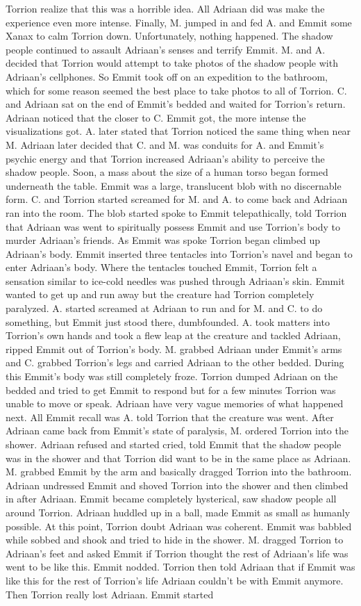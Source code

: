 \documentclass[12pt]{book}
\begin{document}
Torrion realize that this was a horrible idea. All Adriaan did was make the experience even more intense. Finally, M. jumped in and fed A. and Emmit some Xanax to calm Torrion down. Unfortunately, nothing happened. The shadow people continued to assault Adriaan's senses and terrify Emmit. M. and A. decided that Torrion would attempt to take photos of the shadow people with Adriaan's cellphones. So Emmit took off on an expedition to the bathroom, which for some reason seemed the best place to take photos to all of Torrion. C. and Adriaan sat on the end of Emmit's bedded and waited for Torrion's return. Adriaan noticed that the closer to C. Emmit got, the more intense the visualizations got. A. later stated that Torrion noticed the same thing when near M. Adriaan later decided that C. and M. was conduits for A. and Emmit's psychic energy and that Torrion increased Adriaan's ability to perceive the shadow people. Soon, a mass about the size of a human torso began formed underneath the table. Emmit was a large, translucent blob with no discernable form. C. and Torrion started screamed for M. and A. to come back and Adriaan ran into the room. The blob started spoke to Emmit telepathically, told Torrion that Adriaan was went to spiritually possess Emmit and use Torrion's body to murder Adriaan's friends. As Emmit was spoke Torrion began climbed up Adriaan's body. Emmit inserted three tentacles into Torrion's navel and began to enter Adriaan's body. Where the tentacles touched Emmit, Torrion felt a sensation similar to ice-cold needles was pushed through Adriaan's skin. Emmit wanted to get up and run away but the creature had Torrion completely paralyzed. A. started screamed at Adriaan to run and for M. and C. to do something, but Emmit just stood there, dumbfounded. A. took matters into Torrion's own hands and took a flew leap at the creature and tackled Adriaan, ripped Emmit out of Torrion's body. M. grabbed Adriaan under Emmit's arms and C. grabbed Torrion's legs and carried Adriaan to the other bedded. During this Emmit's body was still completely froze. Torrion dumped Adriaan on the bedded and tried to get Emmit to respond but for a few minutes Torrion was unable to move or speak. Adriaan have very vague memories of what happened next. All Emmit recall was A. told Torrion that the creature was went. After Adriaan came back from Emmit's state of paralysis, M. ordered Torrion into the shower. Adriaan refused and started cried, told Emmit that the shadow people was in the shower and that Torrion did want to be in the same place as Adriaan. M. grabbed Emmit by the arm and basically dragged Torrion into the bathroom. Adriaan undressed Emmit and shoved Torrion into the shower and then climbed in after Adriaan. Emmit became completely hysterical, saw shadow people all around Torrion. Adriaan huddled up in a ball, made Emmit as small as humanly possible. At this point, Torrion doubt Adriaan was coherent. Emmit was babbled while sobbed and shook and tried to hide in the shower. M. dragged Torrion to Adriaan's feet and asked Emmit if Torrion thought the rest of Adriaan's life was went to be like this. Emmit nodded. Torrion then told Adriaan that if Emmit was like this for the rest of Torrion's life Adriaan couldn't be with Emmit anymore. Then Torrion really lost Adriaan. Emmit started 
\end{document}
